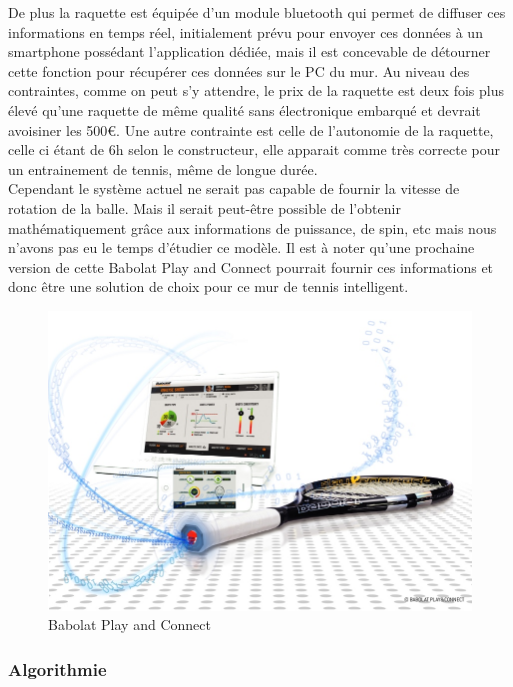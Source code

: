 De plus la raquette est équipée d'un module bluetooth qui permet de diffuser ces informations en temps réel, initialement prévu pour envoyer ces données à un smartphone possédant l'application dédiée, mais il est concevable de détourner cette fonction pour récupérer ces données sur le PC du mur. Au niveau des contraintes, comme on peut s'y attendre, le prix de la raquette est deux fois plus élevé qu'une raquette de même qualité sans électronique embarqué et devrait avoisiner les 500€. Une autre contrainte est celle de l'autonomie de la raquette, celle ci étant de 6h selon le constructeur, elle apparait comme très correcte pour un entrainement de tennis, même de longue durée.\\

Cependant le système actuel ne serait pas capable de fournir la vitesse de rotation de la balle. Mais il serait peut-être possible de l'obtenir mathématiquement grâce aux informations de puissance, de spin, etc mais nous n'avons pas eu le temps d'étudier ce modèle. Il est à noter qu'une prochaine version de cette Babolat Play and Connect pourrait fournir ces informations et donc être une solution de choix pour ce mur de tennis intelligent.

\begin{figure}[h]
\begin{center}
\includegraphics[width=\textwidth]{babolatplayandconnect.jpg}
\caption{Babolat Play and Connect}
\label{img_babolatplayandconnect}
\end{center}
\end{figure}


\subsubsection{Algorithmie}











